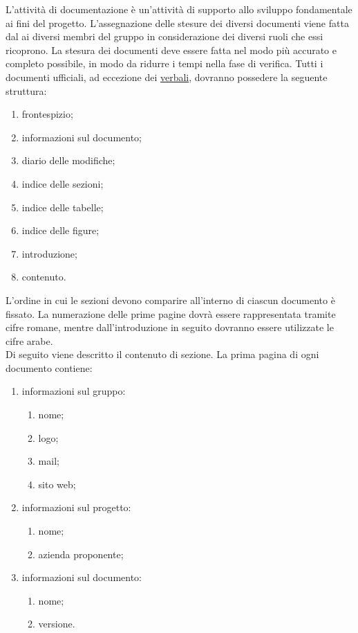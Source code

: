 	L'attività di documentazione è un'attività di supporto allo sviluppo fondamentale ai fini del progetto.
	L'assegnazione delle stesure dei diversi documenti viene fatta dal  ai diversi membri del gruppo in considerazione dei diversi ruoli che essi ricoprono.
	La stesura dei documenti deve essere fatta nel modo più accurato e completo possibile, in modo da ridurre i tempi nella fase di verifica.
				Tutti i documenti ufficiali, ad eccezione dei \hyperref[sec:verbali]{verbali}, dovranno possedere la seguente struttura:
				\begin{enumerate}
					\item frontespizio;
					\item informazioni sul documento;
					\item diario delle modifiche;
					\item indice delle sezioni;
					\item indice delle tabelle;
					\item indice delle figure;
					\item introduzione;
					\item contenuto.
				\end{enumerate}
				L’ordine in cui le sezioni devono comparire all’interno di ciascun documento è fissato. La numerazione delle prime pagine dovrà essere rappresentata tramite cifre romane, mentre dall'introduzione in seguito dovranno essere utilizzate le cifre arabe. \\
				Di seguito viene descritto il contenuto di sezione.
					La prima pagina di ogni documento contiene:
					\begin{enumerate}
						\item informazioni sul gruppo:
						\begin{enumerate}
							\item nome;
							\item logo;
							\item mail;
							\item sito web;
						\end{enumerate}
						\item informazioni sul progetto:
						\begin{enumerate}
							\item nome;
							\item azienda proponente;
						\end{enumerate}
						\item informazioni sul documento:
						\begin{enumerate}
							\item nome;
							\item versione.
						\end{enumerate}
					\end{enumerate}
